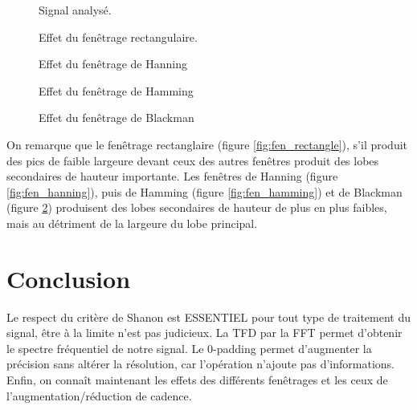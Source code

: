 \documentclass[french]{article}
\begin{document}
  
\begin{figure}[h!]
	\centering
	\begin{minipage}{\textwidth}
		\centering
		
		\caption{Signal analysé.}
		\label{fig:fen_signal}
	\end{minipage}
\end{figure}
\FloatBarrier
\begin{figure}[h!]
  	\begin{minipage}{\textwidth}
  		\centering
  		
  		\caption{Effet du fenêtrage rectangulaire.}
  		\label{fig:fen_rectangle}
  	\end{minipage}
  	\begin{minipage}{\textwidth}
  		\centering
  		
  		\caption{Effet du fenêtrage de Hanning}
  		\label{fig:fen_hanning}
	\end{minipage}
	\begin{minipage}{\textwidth}
		\centering
		
		\caption{Effet du fenêtrage de Hamming}
		\label{fig:fen_hamming}
	\end{minipage}
	\begin{minipage}{\textwidth}
		\centering
		
		\caption{Effet du fenêtrage de Blackman}
		\label{fig:fen_blackman}
	\end{minipage}
\end{figure}

On remarque que le fenêtrage rectanglaire (figure \ref{fig:fen_rectangle}), s'il produit des pics de faible largeure devant ceux des autres fenêtres produit des lobes secondaires de hauteur importante. Les fenêtres de Hanning (figure \ref{fig:fen_hanning}), puis de Hamming (figure \ref{fig:fen_hamming}) et de Blackman (figure \ref{fig:fen_blackman}) produisent des lobes secondaires de hauteur de plus en plus faibles, mais au détriment de la largeure du lobe principal.

\section*{Conclusion}
Le respect du critère de Shanon est ESSENTIEL pour tout type de traitement du signal, être à la limite n'est pas judicieux. La TFD par la FFT permet d'obtenir le spectre fréquentiel de notre signal. Le 0-padding permet d'augmenter la précision sans altérer la résolution, car l'opération n'ajoute pas d'informations. Enfin, on connaît maintenant les effets des différents fenêtrages et les ceux de l'augmentation/réduction de cadence.
\end{document}
